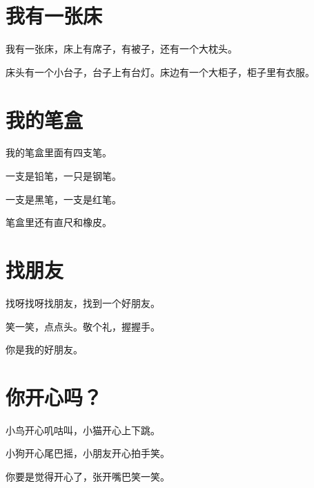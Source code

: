\documentclass[12pt,UTF-8,openany]{ctexbook}
\begin{document}
\chapter{我有一张床}

\begin{large}
    
    我有一张床，床上有席子，有被子，还有一个大枕头。
    
    床头有一个小台子，台子上有台灯。床边有一个大柜子，柜子里有衣服。
    
\end{large}





\chapter{我的笔盒}

\begin{large}
    
    我的笔盒里面有四支笔。
    
    一支是铅笔，一只是钢笔。
    
    一支是黑笔，一支是红笔。
    
    笔盒里还有直尺和橡皮。
    
\end{large}





\chapter{找朋友}

\begin{large}
    
    找呀找呀找朋友，找到一个好朋友。
    
    笑一笑，点点头。敬个礼，握握手。
    
    你是我的好朋友。
    
\end{large}





\chapter{你开心吗？}

\begin{large}
    
    小鸟开心叽咕叫，小猫开心上下跳。
    
    小狗开心尾巴摇，小朋友开心拍手笑。
    
    你要是觉得开心了，张开嘴巴笑一笑。
    
\end{large}
\end{document}
